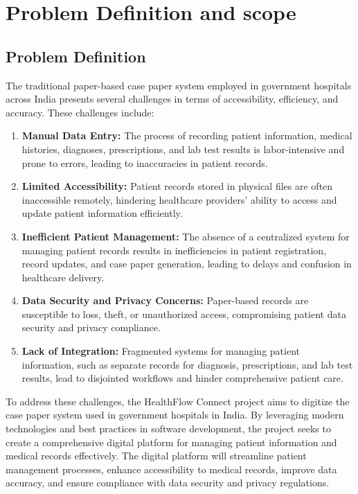 \chapter{Problem Definition and scope}

\section{Problem Definition}

The traditional paper-based case paper system employed in government hospitals across India presents several challenges in terms of accessibility, efficiency, and accuracy. These challenges include:

\begin{enumerate}
    \item \textbf{Manual Data Entry:} The process of recording patient information, medical histories, diagnoses, prescriptions, and lab test results is labor-intensive and prone to errors, leading to inaccuracies in patient records.
    
    \item \textbf{Limited Accessibility:} Patient records stored in physical files are often inaccessible remotely, hindering healthcare providers' ability to access and update patient information efficiently.
    
    \item \textbf{Inefficient Patient Management:} The absence of a centralized system for managing patient records results in inefficiencies in patient registration, record updates, and case paper generation, leading to delays and confusion in healthcare delivery.
    
    \item \textbf{Data Security and Privacy Concerns:} Paper-based records are susceptible to loss, theft, or unauthorized access, compromising patient data security and privacy compliance.
    
    \item \textbf{Lack of Integration:} Fragmented systems for managing patient information, such as separate records for diagnosis, prescriptions, and lab test results, lead to disjointed workflows and hinder comprehensive patient care.
\end{enumerate}

To address these challenges, the HealthFlow Connect project aims to digitize the case paper system used in government hospitals in India. By leveraging modern technologies and best practices in software development, the project seeks to create a comprehensive digital platform for managing patient information and medical records effectively. The digital platform will streamline patient management processes, enhance accessibility to medical records, improve data accuracy, and ensure compliance with data security and privacy regulations.

